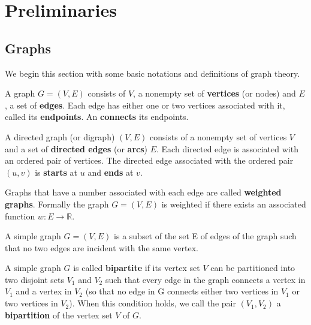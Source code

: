 \chapter{Preliminaries}

\section{Graphs}
We begin this section with some basic notations and definitions of graph theory.
\begin{definition}
    A graph $G=(V,E)$ consists of $V$, a nonempty set of \textbf{vertices} (or nodes) and $E$, a set of \textbf{edges}. Each edge has either one or two vertices associated with it, called its \textbf{endpoints}. An \textbf{connects} its endpoints.
\end{definition}

\begin{definition}
A directed graph (or digraph) $(V,E)$ consists of a nonempty set of vertices $V$ and a set of \textbf{directed edges} (or \textbf{arcs}) $E$. Each directed edge is associated with an ordered pair of vertices. The directed edge associated with the ordered pair $(u,v)$ is \textbf{starts} at $u$ and \textbf{ends} at $v$.
\end{definition}

\begin{definition}
Graphs that have a number associated with each edge are called \textbf{weighted graphs}. Formally the graph $G=(V,E)$ is weighted if there exists an associated function $w: E\rightarrow\mathbb{R}$.
\end{definition}

\begin{definition}
A simple graph $G=(V,E)$ is a subset of the set E of edges of the graph such that no two edges are incident with the same vertex.
\end{definition}

\begin{definition}
A simple graph $G$ is called \textbf{bipartite} if its vertex set $V$ can be partitioned into two disjoint
sets $V_1$ and $V_2$ such that every edge in the graph connects a vertex in $V_1$ and a vertex in $V_2$
(so that no edge in G connects either two vertices in $V_1$ or two vertices in $V_2$). When this
condition holds, we call the pair $(V_1,V_2)$ a \textbf{bipartition} of the vertex set $V$ of $G$.
\end{definition}

